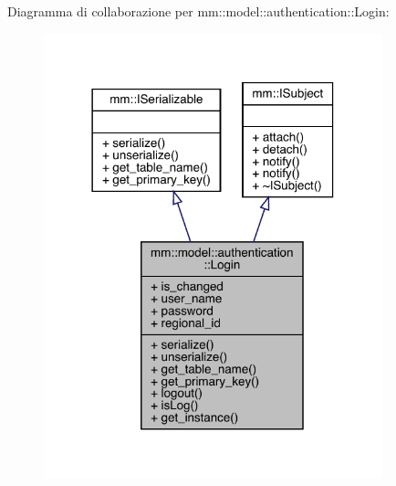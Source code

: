 Diagramma di collaborazione per mm\+:\+:model\+:\+:authentication\+:\+:Login\+:
\nopagebreak
\begin{figure}[H]
\begin{center}
\leavevmode
\includegraphics[width=278pt]{d8/dc8/structmm_1_1model_1_1authentication_1_1_login__coll__graph}
\end{center}
\end{figure}
